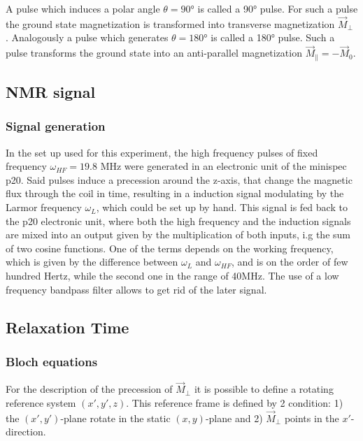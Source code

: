 A pulse which induces a  polar angle $\theta = 90$° is called a 90° pulse. For such a pulse the ground state magnetization is transformed into transverse magnetization $\vec{M}_{\perp}$%
. Analogously a pulse which generates $\theta = 180°$ is called a 180° pulse. Such a pulse transforms the ground state into an anti-parallel magnetization $\vec{M}_{\parallel} = -\vec{M}_0$. %
\subsection{NMR signal}
\subsubsection{Signal generation}
In the set up used for this experiment, the high frequency pulses of fixed frequency $\omega_{HF} = 19.8$ MHz were generated in an electronic unit of the minispec p20. Said pulses induce a precession around the z-axis, that change the magnetic flux through the coil in time, resulting in a induction signal modulating by the Larmor frequency $\omega_L$, which could be set up by hand. This signal is fed back to the p20 electronic unit, where both the high frequency and the induction signals are mixed into an output given by the multiplication of both inputs, i.g the sum of two cosine functions. One of the terms depends on the working frequency, which is given by the difference between $\omega_L$ and $\omega_{HF}$, and is on the order of few hundred Hertz, while the second one in the range of 40MHz. The use of a low frequency bandpass filter allows to get rid of the later signal.   
\subsection{Relaxation Time}
\subsubsection{Bloch equations}
For the description of the precession of $\vec{M}_{\perp}$ it is possible to define a rotating reference system $(x', y', z)$. This reference frame is defined by 2 condition: 1) the $(x', y')$-plane rotate in the static $(x, y)$-plane and 2) $\vec{M}_{\perp}$ points in the $x'$-direction.

